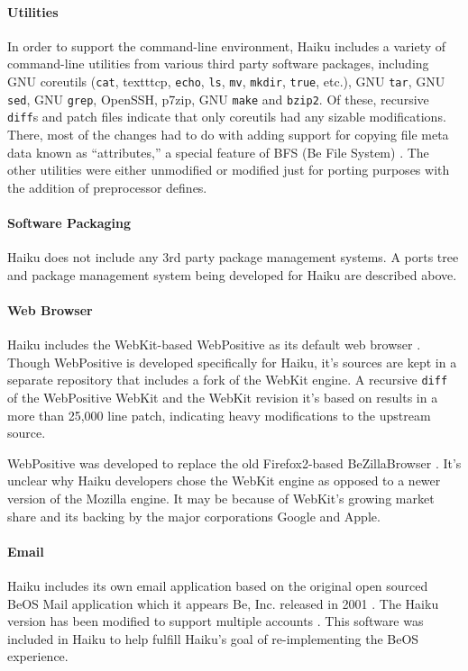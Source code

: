 \documentclass{article}
\begin{document}
\paragraph{Utilities}
In order to support the command-line environment, Haiku includes a
variety of command-line utilities from various third party software
packages, including GNU coreutils (\texttt{cat},
texttt{cp}, \texttt{echo}, \texttt{ls}, \texttt{mv}, \texttt{mkdir},
\texttt{true}, etc.), GNU \texttt{tar}, GNU \texttt{sed}, GNU
\texttt{grep}, OpenSSH, p7zip, GNU \texttt{make} and \texttt{bzip2}.
Of these, recursive \texttt{diff}s and patch files \cite{HaikuR1A3Src}
indicate that only coreutils had any sizable modifications.  There,
most of the changes had to do with adding support for copying file
meta data known as ``attributes,'' a special feature of BFS (Be File
System)
\cite{BFSWiki}.  The other utilities were either unmodified or
modified just for porting purposes with the addition of preprocessor
defines.

\paragraph{Software Packaging}
Haiku does not include any 3rd party package management systems.  A
ports tree and package management system being developed for Haiku are
described above.

\paragraph{Web Browser}
Haiku includes the WebKit-based WebPositive as its default web browser
\cite{WebPositiveWiki}.  Though WebPositive is developed specifically
for Haiku, it's sources are kept in a separate repository
\cite{WebPositiveTrac} that includes a fork of the WebKit engine.  A
recursive \texttt{diff} of the WebPositive WebKit and the WebKit
revision it's based on results in a more than 25,000 line patch,
indicating heavy modifications to the upstream source.

WebPositive was developed to replace the old Firefox2-based
BeZillaBrowser \cite{WebPositiveWiki}.  It's unclear why Haiku
developers chose the WebKit engine as opposed to a newer version of
the Mozilla engine.  It may be because of WebKit's growing market
share and its backing by the major corporations Google and Apple.

\paragraph{Email}
Haiku includes its own email application based on the original open
sourced BeOS Mail application \cite{BeMailOpenSourced} which it
appears Be, Inc. released in 2001 \cite{BeMailLICENSE}.  The Haiku
version has been modified to support multiple accounts
\cite{BeMailOpenSourced}.  This software was included in Haiku to help
fulfill Haiku's goal of re-implementing the BeOS experience.
\end{document}
